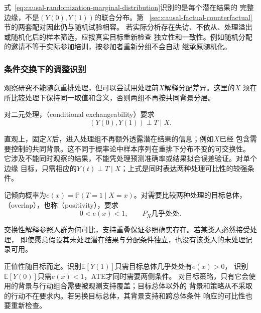 式~\eqref{eq:causal-randomization-marginal-distribution}识别的是每个潜在结果的
完整边缘，不是\((Y(0),Y(1))\)的联合分布。第
~\ref{sec:causal-factual-counterfactual}节的两套配对因此仍与随机试验相容。
若实际分析存在失访、不依从、处理溢出或随机化后的样本筛选，应按真实目标重新检查
独立性和一致性。例如随机分配的邀请不等于实际参加培训，按参加者重新分组不会自动
继承原随机化。

\subsubsection{条件交换下的调整识别}
\label{sec:causal-adjustment-identification}

观察研究不能随意重排处理，但可以尝试用处理前\(X\)解释分配差异。这里的\(X\)
须在所比较处理下保持同一取值和含义，否则两组不再按共同背景分层。
\begin{definition}[条件交换性]
  \label{def:causal-conditional-exchangeability}
  对二元处理，（conditional exchangeability）要求
  \begin{equation}
    (Y(0),Y(1))\perp T\mid X.
    \label{eq:causal-conditional-exchangeability}
  \end{equation}
\end{definition}
直观上，固定\(X\)后，进入处理组不再额外透露潜在结果的信息；例如\(X\)已经
包含需要控制的共同背景。这不同于概率论中样本序列在重排下分布不变的可交换性。
它涉及不能同时观察的结果，不能凭处理预测准确率或结果拟合误差验证。对单个边缘
目标，只需相应的\(Y(t)\perp T\mid X\)；上式是同时表达两种处理可比性的较强条件。

\begin{definition}[二元处理的支持重叠]
  \label{def:causal-overlap}
  记倾向概率为\(e(x)=\mathbb P(T=1\mid X=x)\)。对需要比较两种处理的目标总体，
  （overlap），也称（positivity），要求
  \begin{equation}
    0<e(x)<1,\qquad P_X\text{几乎处处}.
    \label{eq:causal-overlap}
  \end{equation}
\end{definition}
交换性解释参照人群为何可比，支持重叠保证参照确实存在。若某类人必然接受处理，
即使愿意假设其未处理潜在结果与分配条件独立，也没有该类人的未处理记录可用。

正值性随目标而定。识别\(\mathbb E[Y(1)]\)只需目标总体几乎处处有\(e(x)>0\)，
识别\(\mathbb E[Y(0)]\)只需\(e(x)<1\)，ATE才同时需要两侧条件。
对目标策略，只有它会使用的背景与行动组合需要被观测支持覆盖；目标总体以外的
背景和策略从不采取的行动不在要求内。若另换目标总体，其背景支持和跨总体条件
响应的可比性也要重新检查。

